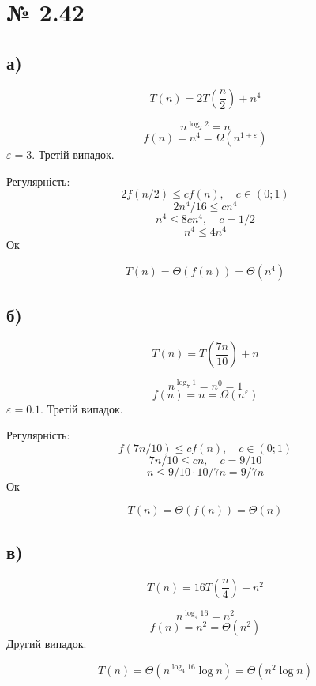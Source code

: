 \documentclass[11pt, a4paper]{article} %
\begin{document}
\section*{№ 2.42}
\subsection*{а)}
\begin{mdframed}
    $$T(n) = 2T(\frac{n}{2}) + n^4$$
\end{mdframed}

$$n^{\log_2 2} = n$$
$$f(n) = n^4 = \Omega(n^{1+\varepsilon})$$
$\varepsilon = 3$. Третій випадок.

Регулярність:
$$2f(n/2) \le c f(n),\quad c\in (0;1)$$
$$2n^4/16 \le c n^4$$
$$n^4 \le 8c n^4, \quad c=1/2$$
$$n^4 \le 4 n^4$$
Ок

\begin{mdframed}[style=ans]
    $$T(n) = \Theta(f(n)) = \Theta(n^4)$$
\end{mdframed}

\subsection*{б)}
\begin{mdframed}
    $$T(n) = T(\frac{7n}{10}) + n$$
\end{mdframed}

$$n^{\log_7 1} = n^0 = 1$$
$$f(n) = n = \Omega(n^{\varepsilon})$$
$\varepsilon = 0.1$. Третій випадок.

Регулярність:
$$f(7n/10) \le c f(n),\quad c\in (0;1)$$
$$7n/10 \le c n, \quad c=9/10$$
$$n \le 9/10 \cdot 10/7 n = 9/7 n $$
Ок

\begin{mdframed}[style=ans]
    $$T(n) = \Theta(f(n)) = \Theta(n)$$
\end{mdframed}

\subsection*{в)}
\begin{mdframed}
    $$T(n) = 16T(\frac{n}{4}) + n^2$$
\end{mdframed}

$$n^{\log_4 16} = n^2$$
$$f(n) = n^2 = \Theta(n^2)$$
Другий випадок.

\begin{mdframed}[style=ans]
    $$T(n) = \Theta(n^{\log_4 16}\log n) = \Theta(n^2 \log n)$$
\end{mdframed}
\end{document}
